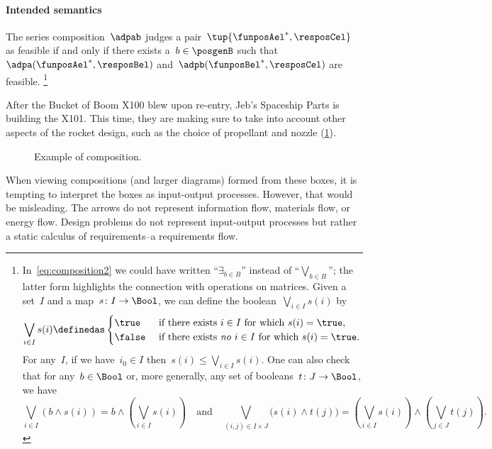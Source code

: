 \paragraph{Intended semantics}
The series composition~$\adpab$ judges a pair~$\tup{\funposAel^*,\resposCel}$ as feasible if and only if there exists a~$b \in \posgenB$ such that~$\adpa(\funposAel^*,\resposBel)$ and~$\adpb(\funposBel^*,\resposCel)$ are feasible.
\footnote{In~\cref{eq:composition2} we could have written ``$\exists_{b\in B}$'' instead of ``$\bigvee_{b\in B}$''; the latter form highlights the connection with operations on matrices.
Given a set~$I$ and a map~$s\colon I\to\Bool$, we can define the boolean~$\bigvee_{i\in I}s(i)$ by
  \begin{equation*}
    \bigvee_{i\in I}s(i)\definedas
    \begin{cases}
      \true&\text{ if there exists }i\in I\text{ for which }s(i)=\true,\\
      \false&\text{ if there exists \emph{no} }i\in I\text{ for which }s(i)=\true.
    \end{cases}
  \end{equation*}
  For any~$I$, if we have~$i_0\in I$ then~$s(i)\leq\bigvee_{i\in I}s(i)$. One can also check that for any~$b\in\Bool$ or, more generally, any set of booleans~$t\colon J\to\Bool$, we have
  \begin{equation*}
    \bigvee_{i\in I}(b\wedge s(i))=b\wedge\left(\bigvee_{i\in I}s(i)\right)
    \quad\text{and}\quad
    \bigvee_{(i,j)\in I\times  J}\big(s(i)\wedge t(j)\big)=\left(\bigvee_{i\in I}s(i)\right)\wedge\left(\bigvee_{j\in J} t(j)\right).
  \end{equation*}
}

\begin{example}
  After the Bucket of Boom X100 blew upon re-entry, Jeb's Spaceship Parts is building the X101. This time, they are making sure to take into account other aspects of the rocket design, such as the choice of propellant and nozzle (\cref{fig:examplecomposition}).
  \begin{figure}[h!]
    \begin{center}
    \end{center}
    \caption{Example of composition. \label{fig:examplecomposition}}
  \end{figure}
\end{example}

\begin{remark}
  When viewing compositions (and larger diagrams) formed from these boxes, it is tempting to interpret the boxes as input-output processes.
  However, that would be misleading. The arrows do not represent information flow, materials flow, or energy flow.
  Design problems do not represent input-output processes but rather a static calculus of requirements--a requirements flow.
\end{remark}

